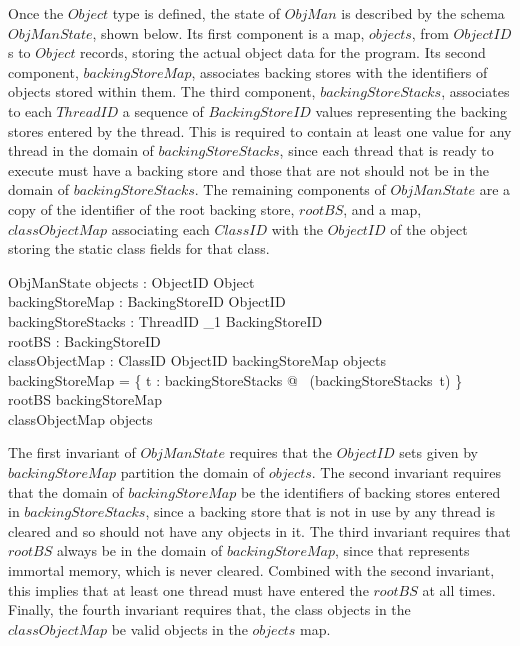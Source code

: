 Once the $Object$ type is defined, the state of $ObjMan$ is described
by the schema $ObjManState$, shown below.
Its first component is a map, $objects$, from $ObjectID$s to $Object$
records, storing the actual object data for the program.
Its second component, $backingStoreMap$, associates backing stores
with the identifiers of objects stored within them.
The third component, $backingStoreStacks$, associates to each
$ThreadID$ a sequence of $BackingStoreID$ values representing the
backing stores entered by the thread.
This is required to contain at least one value for any thread in the
domain of $backingStoreStacks$, since each thread that is ready to
execute must have a backing store and those that are not should not be
in the domain of $backingStoreStacks$.
The remaining components of $ObjManState$ are a copy of the identifier
of the root backing store, $rootBS$, and a map, $classObjectMap$
associating each $ClassID$ with the $ObjectID$ of the object storing
the static class fields for that class.
\begin{schema}{ObjManState}
  objects : ObjectID \pfun Object \\
  backingStoreMap : BackingStoreID \pfun \finset ObjectID \\
  backingStoreStacks : ThreadID \pfun \seq_1 BackingStoreID \\
  rootBS : BackingStoreID \\
  classObjectMap : ClassID \pfun ObjectID
\where
  backingStoreMap \partition \dom objects \\
  \dom backingStoreMap = \bigcup \{ t : \dom backingStoreStacks @ \ran~(backingStoreStacks~t) \} \\
  rootBS \in \dom backingStoreMap \\
  \ran classObjectMap \subseteq \dom objects
\end{schema}
The first invariant of $ObjManState$ requires that the $ObjectID$ sets
given by $backingStoreMap$ partition the domain of $objects$.
The second invariant requires that the domain of $backingStoreMap$ be
the identifiers of backing stores entered in $backingStoreStacks$,
since a backing store that is not in use by any thread is cleared and
so should not have any objects in it.
The third invariant requires that $rootBS$ always be in the domain of
$backingStoreMap$, since that represents immortal memory, which is
never cleared.
Combined with the second invariant, this implies that at least one
thread must have entered the $rootBS$ at all times.
Finally, the fourth invariant requires that, the class objects in the
$classObjectMap$ be valid objects in the $objects$ map.

